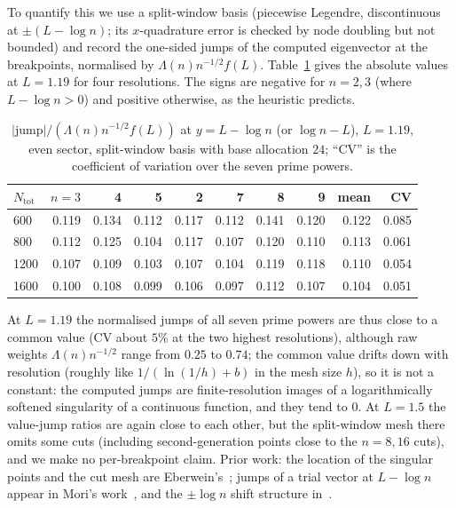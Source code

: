 \documentclass[11pt]{amsart}
\theoremstyle{definition}
\theoremstyle{remark}
\numberwithin{equation}{section}
\begin{document}
To quantify this we use a split-window basis (piecewise Legendre, discontinuous at $\pm(L-\log n)$; its $x$-quadrature error is checked by node doubling but not bounded) and record the one-sided jumps of the computed eigenvector at the breakpoints, normalised by $\Lambda(n)n^{-1/2}f(L)$. Table~\ref{tab:kinks} gives the absolute values at $L=1.19$ for four resolutions. The signs are negative for $n=2,3$ (where $L-\log n>0$) and positive otherwise, as the heuristic predicts.

\begin{table}[ht]
\centering\footnotesize
\caption{$|\text{jump}|/(\Lambda(n)n^{-1/2}f(L))$ at $y=L-\log n$ (or $\log n-L$), $L=1.19$, even sector, split-window basis with base allocation $24$; ``CV'' is the coefficient of variation over the seven prime powers.}\label{tab:kinks}
\begin{tabular}{lrrrrrrrrr}
\toprule
$N_{\mathrm{tot}}$ & $n=3$ & 4 & 5 & 2 & 7 & 8 & 9 & mean & CV\\
\midrule
600 & 0.119 & 0.134 & 0.112 & 0.117 & 0.112 & 0.141 & 0.120 & 0.122 & 0.085\\
800 & 0.112 & 0.125 & 0.104 & 0.117 & 0.107 & 0.120 & 0.110 & 0.113 & 0.061\\
1200 & 0.107 & 0.109 & 0.103 & 0.107 & 0.104 & 0.119 & 0.118 & 0.110 & 0.054\\
1600 & 0.100 & 0.108 & 0.099 & 0.106 & 0.097 & 0.112 & 0.107 & 0.104 & 0.051\\
\bottomrule
\end{tabular}
\end{table}

At $L=1.19$ the normalised jumps of all seven prime powers are thus close to a common value (CV about $5\%$ at the two highest resolutions), although raw weights $\Lambda(n)n^{-1/2}$ range from $0.25$ to $0.74$; the common value drifts down with resolution (roughly like $1/(\ln(1/h)+b)$ in the mesh size $h$), so it is not a constant: the computed jumps are finite-resolution images of a logarithmically softened singularity of a continuous function, and they tend to $0$. At $L=1.5$ the value-jump ratios are again close to each other, but the split-window mesh there omits some cuts (including second-generation points close to the $n=8,16$ cuts), and we make no per-breakpoint claim. Prior work: the location of the singular points and the cut mesh are Eberwein's~\cite[\S13]{Eberwein}; jumps of a trial vector at $L-\log n$ appear in Mori's work~\cite{Mori}, and the $\pm\log n$ shift structure in~\cite[eq.~(2.11)]{Suzuki}.
\end{document}
